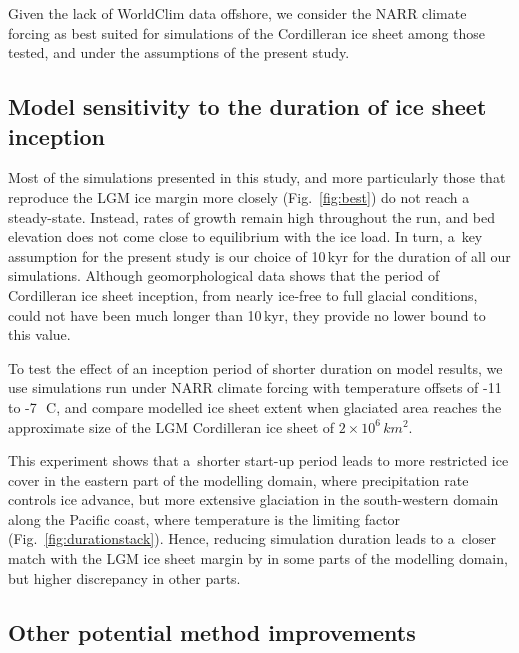 \documentclass[tc, ms]{copernicus}
\begin{document}
Given the lack of WorldClim data offshore, we consider the NARR climate forcing as best suited for simulations of the Cordilleran ice sheet among those tested, and under the assumptions of the present study.

\subsection{Model sensitivity to the duration of ice sheet inception}

Most of the simulations presented in this study, and more particularly those that reproduce the LGM ice margin more closely (Fig.~\ref{fig:best}) do not reach a steady-state. Instead, rates of growth remain high throughout the run, and bed elevation does not come close to equilibrium with the ice load. In turn, a~key assumption for the present study is our choice of 10\,kyr for the duration of all our simulations. Although geomorphological data shows that the period of Cordilleran ice sheet inception, from nearly ice-free to full glacial conditions, could not have been much longer than 10\,kyr, they provide no lower bound to this value.

To test the effect of an inception period of shorter duration on model results, we use simulations run under NARR climate forcing with temperature offsets of -11 to -7\,\unit{{\degree}C}, and compare modelled ice sheet extent when glaciated area reaches the approximate size of the LGM Cordilleran ice sheet of $2\times 10^6\,\unit{km^2}$.

This experiment shows that a~shorter start-up period leads to more restricted ice cover in the eastern part of the modelling domain, where precipitation rate controls ice advance, but more extensive glaciation in the south-western domain along the Pacific coast, where temperature is the limiting factor (Fig.~\ref{fig:durationstack}). Hence, reducing simulation duration leads to a~closer match with the LGM ice sheet margin by \citet{dyke-2004} in some parts of the modelling domain, but higher discrepancy in other parts.

\subsection{Other potential method improvements}
\end{document}
